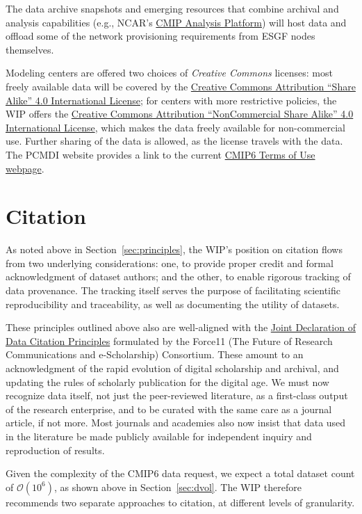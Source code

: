 \documentclass[gmd,manuscript]{copernicus}
\newcommand{\secref}[1] {\mbox{Section  \ref{sec:#1}}}
\begin{document}
The data archive snapshots and emerging resources that combine
archival and analysis capabilities (e.g., NCAR's
\href{https://goo.gl/sYTxC2}{CMIP Analysis Platform}) will host data
and offload some of the network provisioning requirements from ESGF
nodes themselves.

Modeling centers are offered two choices of \emph{Creative Commons
}licenses: most freely available data will be covered by the
\href{https://goo.gl/CY5m2v}{Creative Commons Attribution ``Share
  Alike'' 4.0 International License}; for centers with more
restrictive policies, the WIP offers the
\href{https://goo.gl/KUNUKq}{Creative Commons Attribution
  ``NonCommercial Share Alike'' 4.0 International License}, which
makes the data freely available for non-commercial use. Further
sharing of the data is allowed, as the license travels with the data.
The PCMDI website provides a link to the current
\href{https://pcmdi.llnl.gov/CMIP6/TermsOfUse}{CMIP6 Terms of Use
  webpage}.

\section{Citation}
\label{sec:cite}

As noted above in \secref{principles}, the WIP's position on citation
flows from two underlying considerations: one, to provide proper
credit and formal acknowledgment of dataset authors; and the other, to
enable rigorous tracking of data provenance. The tracking itself
serves the purpose of facilitating scientific reproducibility and
traceability, as well as documenting the utility of datasets.

These principles outlined above also are well-aligned with the
\href{https://goo.gl/Pzb7F6}{Joint Declaration of Data Citation 
Principles} formulated by the Force11 (The Future of Research
Communications and e-Scholarship) Consortium. These amount to an
acknowledgment of the rapid evolution of digital scholarship and
archival, and updating the rules of scholarly publication for the
digital age. We must now recognize data itself, not just the
peer-reviewed literature, as a first-class output of the research
enterprise, and to be curated with the same care as a journal article,
if not more. Most journals and academies also now insist that data used
in the literature be made publicly available for independent
inquiry and reproduction of results.

Given the complexity of the CMIP6 data request, we expect a total
dataset count of $\mathcal{O}(10^6)$, as shown above in \secref{dvol}.
The WIP therefore recommends two separate approaches to citation, at
different levels of granularity.
\end{document}
